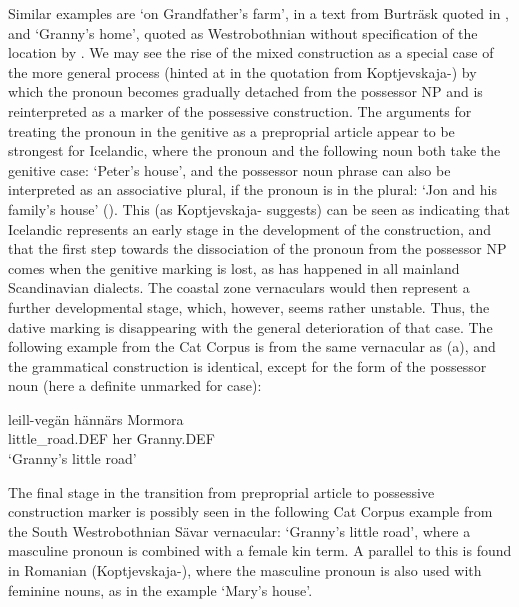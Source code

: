 Similar examples are  ‘on Grandfather’s farm’, in a text from Burträsk quoted in \citet[104]{Wessén1966}, and  ‘Granny’s home’, quoted as Westrobothnian without specification of the location by \citet[131]{Larsson1929}. We may see the rise of the mixed construction as a special case of the more general process (hinted at in the quotation from Koptjevskaja-\citet{Tamm2003}) by which the pronoun becomes gradually detached from the possessor NP and is reinterpreted as a marker of the possessive construction. The arguments for treating the pronoun in the genitive as a preproprial article appear to be strongest for Icelandic, where the pronoun and the following noun both take the genitive case: ‘Peter’s house’, and the possessor noun phrase can also be interpreted as an associative plural, if the pronoun is in the plural:  ‘Jon and his family’s house’ (\citet[69]{Delsing2003b}). This (as Koptjevskaja-\citet[632]{Tamm2003} suggests) can be seen as indicating that Icelandic represents an early stage in the development of the construction, and that the first step towards the dissociation of the pronoun from the possessor NP comes when the genitive marking is lost, as has happened in all mainland Scandinavian dialects. The coastal zone vernaculars would then represent a further developmental stage, which, however, seems rather unstable. Thus, the dative marking is disappearing with the general deterioration of that case. The following example from the Cat Corpus is from the same vernacular as (a), and the grammatical construction is identical, except for the form of the possessor noun (here a definite unmarked for case): 

\ea\label{}
\gll leill-vegän  hännärs  Mormora\\
little\_road.DEF  her  Granny.DEF\\
\glt ‘Granny’s little road’
\z

 The final stage in the transition from preproprial article to possessive construction marker is possibly seen in the following Cat Corpus example from the South Westrobothnian Sävar vernacular: ‘Granny’s little road’, where a masculine pronoun is combined with a female kin term. A parallel to this is found in Romanian (Koptjevskaja-\citet[632]{Tamm2003}), where the masculine pronoun  is also used with feminine nouns, as in the example  ‘Mary’s house’.

